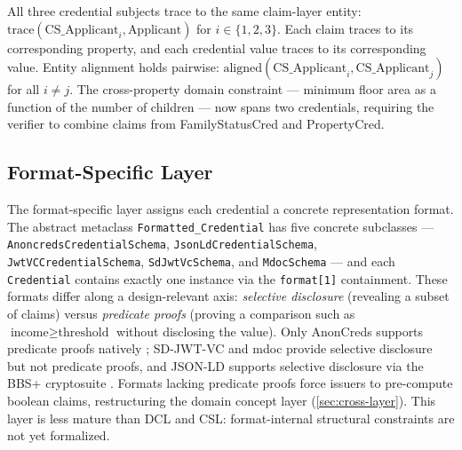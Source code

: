 All three credential subjects trace to the same claim-layer entity: \(\text{trace}(\text{CS\_Applicant}_i, \text{Applicant})\) for \(i \in \{1,2,3\}\). Each claim traces to its corresponding property, and each credential value traces to its corresponding value. Entity alignment holds pairwise: \(\text{aligned}(\text{CS\_Applicant}_i, \text{CS\_Applicant}_j)\) for all \(i \neq j\). The cross-property domain constraint --- minimum floor area as a function of the number of children --- now spans two credentials, requiring the verifier to combine claims from FamilyStatusCred and PropertyCred.

\subsection{Format-Specific Layer}\label{format-specific-layer}

\label{sec:fsl}

The format-specific layer assigns each credential a concrete representation format. The abstract metaclass \texttt{Formatted\_Credential} has five concrete subclasses --- \texttt{AnoncredsCredentialSchema}, \texttt{JsonLdCredentialSchema}, \texttt{JwtVCCredentialSchema}, \texttt{SdJwtVcSchema}, and \texttt{MdocSchema} --- and each \texttt{Credential} contains exactly one instance via the \texttt{format{[}1{]}} containment. These formats differ along a design-relevant axis: \emph{selective disclosure} (revealing a subset of claims) versus \emph{predicate proofs} (proving a comparison such as \(\text{income} \geq \text{threshold}\) without disclosing the value). Only AnonCreds supports predicate proofs natively \citep{curran2022anoncreds}; SD-JWT-VC \citep{terbu_sd-jwt-based_2026} and mdoc \citep{_mobile_2021} provide selective disclosure but not predicate proofs, and JSON-LD supports selective disclosure via the BBS+ cryptosuite \citep{_bbs_2024, lookerBBSSignatureScheme2026}. Formats lacking predicate proofs force issuers to pre-compute boolean claims, restructuring the domain concept layer (\autoref{sec:cross-layer}). This layer is less mature than DCL and CSL: format-internal structural constraints are not yet formalized.

